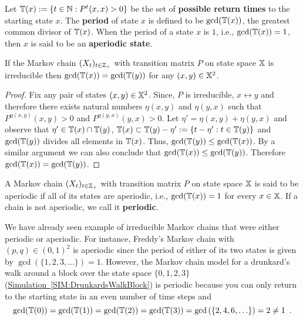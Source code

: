 \begin{definition}
Let $\mathbb{T}(x) := \{t \in \mathbb{N} : P^t(x,x)>0\}$ be the set of {\bf possible return times} to the starting state $x$.  The {\bf period} of state $x$ is defined to be $\gcd(\mathbb{T}(x))$, the greatest common divisor of $\mathbb{T}(x)$.  When the period of a state $x$ is $1$, i.e., $\gcd(\mathbb{T}(x))=1$, then $x$ is said to be an {\bf aperiodic state}.
\end{definition}

\begin{prop}
If the Markov chain $(X_t)_{t\in\mathbb{Z}_+}$ with transition matrix $P$ on state space $\mathbb{X}$ is irreducible then $\gcd(\mathbb{T}(x)) = \gcd(\mathbb{T}(y))$ for any $(x,y) \in \mathbb{X}^2$.
\begin{proof}
Fix any pair of states $(x,y) \in \mathbb{X}^2$.  Since, $P$ is irreducible, $x \leftrightarrow y$ and therefore there exists natural numbers $\eta(x,y)$ and $\eta(y,x)$ such that $P^{\eta(x,y)}(x,y)>0$ and $P^{\eta(y,x)}(y,x)>0$.  Let $\eta' = \eta(x,y)+\eta(y,x)$ and observe that $\eta' \in \mathbb{T}(x) \cap \mathbb{T}(y)$, $\mathbb{T}(x) \subset \mathbb{T}(y) - \eta' := \{t-\eta' : t \in \mathbb{T}(y)\}$ and $\gcd(\mathbb{T}(y))$ divides all elements in $\mathbb{T}(x)$.  Thus, $\gcd(\mathbb{T}(y)) \leq \gcd(\mathbb{T}(x))$.  By a similar argument we can also conclude that $\gcd(\mathbb{T}(x)) \leq \gcd(\mathbb{T}(y))$.  Therefore $\gcd(\mathbb{T}(x))=\gcd(\mathbb{T}(y))$.
\end{proof}
\end{prop}

\begin{definition}[Aperiodic]
A Markov chain $(X_t)_{t\in\mathbb{Z}_+}$ with transition matrix $P$ on state space $\mathbb{X}$ is said to be {aperiodic} if all of its states are aperiodic, i.e., $\gcd(\mathbb{T}(x))=1$ for every $x \in \mathbb{X}$.  If a chain is not aperiodic, we call it {\bf periodic}.
\end{definition}

We have already seen example of irreducible Markov chains that  were either periodic or aperiodic.  For instance, Freddy's Markov chain with $(p,q) \in (0,1)^2$ is aperiodic since the period of either of its two states is given by $\gcd(\{1,2,3,\ldots\})=1$.  However, the Markov chain model for a drunkard's walk around a block over the state space $\{0,1,2,3\}$ (\hyperref[SIM:DrunkardsWalkBlock]{Simulation~\ref*{SIM:DrunkardsWalkBlock}}) is periodic because you can only return to the starting state in an even number of time steps and 
$$
\gcd(\mathbb{T}(0))=\gcd(\mathbb{T}(1))=\gcd(\mathbb{T}(2))=\gcd(\mathbb{T}(3))= \gcd \left( \{2,4,6,\ldots\} \right) =2 \neq 1 \enspace .
$$


